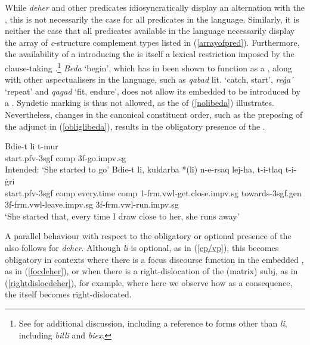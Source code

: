 \documentclass[output=paper]{LSP/langsci}
\begin{document}
While \emph{deher} and other  predicates idiosyncratically display an alternation with the , this is not necessarily the case for all  predicates in the language. Similarly, it is neither the case that all  predicates available in the language necessarily display the array of \emph{c}-structure complement types listed in (\ref{arrayofpred}). Furthermore, the availability of a  introducing the  is itself a lexical restriction imposed by the clause-taking .\footnote{See  for additional discussion, including a reference to  forms other than \emph{li}, including \emph{billi} and \emph{biex}.} \emph{Beda} `begin', which has in \citet{Camilleri16} been shown to function as a , along with other aspectualisers in the language, such as \emph{qabad} lit. `catch, start', \emph{re{\.g}a'} `repeat' and \emph{qag\textcrh ad} `fit, endure', does not allow its embedded  to be introduced by a . Syndetic marking is thus not allowed, as the  of (\ref{nolibeda}) illustrates. Nevertheless, changes in the canonical  constituent order, such as the preposing of the {\sc adj}unct in (\ref{obliglibeda}), results in the obligatory presence of the .%

\ea
\ea \label{nolibeda}
\gll *Bdie-t li t-mur\\
start.{\sc pfv-3sgf} {\sc comp} 3{\sc f}-go.{\sc impv.sg}\\
\glt Intended: `She started to go'
\ex \label{obliglibeda}
\gll Bdie-t li, kuldarba *(li) n-e-rsaq lej-ha, t-i-tlaq t-i-{\.g}ri\\
start.{\sc pfv-3sgf} {\sc comp} every.time {\sc comp} 1-{\sc frm.vwl}-get.close.{\sc impv.sg} towards-{\sc 3sgf.gen} 3{\sc f}-{\sc frm.vwl}-leave.{\sc impv.sg} 3{\sc f}-{\sc frm.vwl}-run.{\sc impv.sg}\\

\glt `She started that, every time I draw close to her, she runs away' \hfill{}
\z
\z

A parallel behaviour with respect to the obligatory or optional presence of the  also follows for \emph{deher}. Although \emph{li} is optional, as in (\ref{cp/vp}), this becomes obligatory in contexts where there is a {\sc focus} discourse function in the embedded , as in (\ref{focdeher}), or when there is a right-dislocation of the (matrix) {\sc subj}, as in (\ref{rightdislocdeher}), for example, where here we observe how as a consequence, the  itself becomes right-dislocated.
\end{document}

